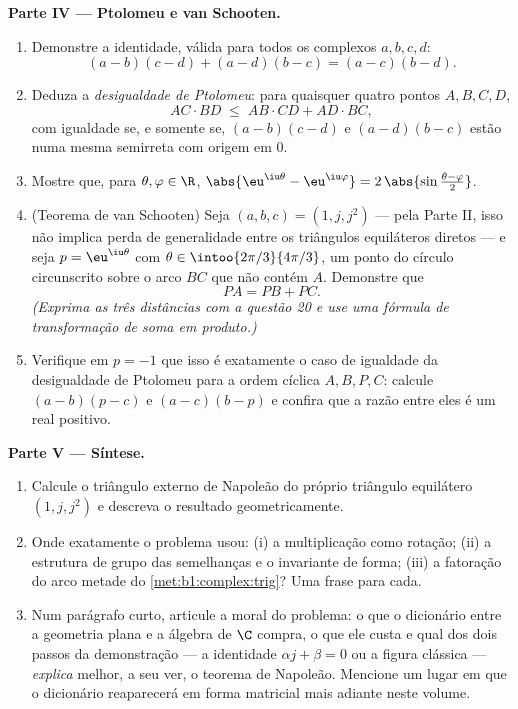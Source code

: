 \begin{problem}
\medskip
\noindent\textbf{Parte IV --- Ptolomeu e van Schooten.}
\begin{enumerate}
  \item Demonstre a identidade, válida para todos os complexos $a, b, c, d$:
        \[
        (a - b)(c - d) + (a - d)(b - c) = (a - c)(b - d) .
        \]
  \item Deduza a \emph{desigualdade de Ptolomeu}: para quaisquer quatro pontos $A, B, C, D$,
        \[
        AC \cdot BD \;\leq\; AB \cdot CD + AD \cdot BC ,
        \]
        com igualdade se, e somente se, $(a-b)(c-d)$ e
        $(a-d)(b-c)$ estão numa mesma semirreta com origem em $0$.
  \item Mostre que, para $\theta, \varphi \in \R$,
        $\abs{\eu^{\iu\theta} - \eu^{\iu\varphi}} =
        2\,\abs{\sin\frac{\theta - \varphi}2}$.
  \item (Teorema de van Schooten) Seja
        $(a, b, c) = (1, j, j^2)$ --- pela Parte II, isso não implica perda de
        generalidade entre os triângulos equiláteros diretos --- e seja
        $p = \eu^{\iu\theta}$ com $\theta \in
        \intoo{2\pi/3}{4\pi/3}$, um ponto do círculo circunscrito sobre o
        arco $BC$ que não contém $A$. Demonstre que
        \[
        PA = PB + PC .
        \]
        \emph{(Exprima as três distâncias com a questão 20 e use
        uma fórmula de transformação de soma em produto.)}
  \item Verifique em $p = -1$ que isso é exatamente o caso de igualdade
        da desigualdade de Ptolomeu para a ordem cíclica $A, B, P, C$:
        calcule $(a - b)(p - c)$ e $(a - c)(b - p)$ e confira
        que a razão entre eles é um real positivo.
\end{enumerate}

\medskip
\noindent\textbf{Parte V --- Síntese.}
\begin{enumerate}
  \item Calcule o triângulo externo de Napoleão do próprio triângulo
        equilátero $(1, j, j^2)$ e descreva o resultado
        geometricamente.
  \item Onde exatamente o problema usou: (i) a multiplicação como
        rotação; (ii) a estrutura de grupo das semelhanças e o
        invariante de forma; (iii) a fatoração do arco metade do
        \cref{met:b1:complex:trig}? Uma frase para cada.
  \item Num parágrafo curto, articule a moral do problema:
        o que o dicionário entre a geometria plana e a álgebra de $\C$
        compra, o que ele custa e qual dos dois passos da demonstração
        --- a identidade $\alpha j + \beta = 0$ ou a figura clássica ---
        \emph{explica} melhor, a seu ver, o teorema de Napoleão.
        Mencione um lugar em que o dicionário reaparecerá em forma
        matricial mais adiante neste volume.
\end{enumerate}
\end{problem}
